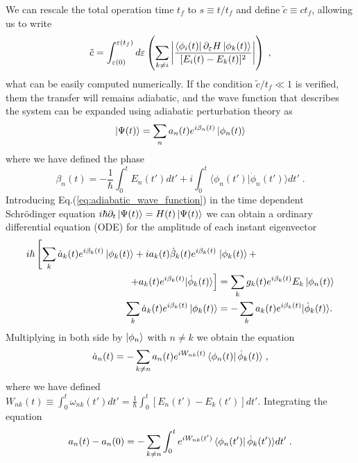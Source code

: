 \documentclass[a4paper,11pt]{article}
\begin{document}
We can rescale the total operation time $t_f$ to $s\equiv t/t_f$ and define $\tilde{c}\equiv ct_f$, allowing us to write
\begin{equation}
	\tilde{c}=\int_{\varepsilon(0)}^{\varepsilon(t_f)}d\varepsilon\left(\sum _{k\neq i}\abs{\frac{\bra{\phi_i(t)}\partial_\varepsilon H\ket{\phi_k(t)}}{[E_i(t)-E_k(t)]^2}}\right)\; , 
	\label{eq:def_c_tilde}
\end{equation}
what can be easily computed numerically. If the condition $\tilde{c}/t_f\ll1$ is verified, them the transfer will remains adiabatic, and the wave function that describes the system can be expanded using adiabatic perturbation theory as
\begin{equation}
	\ket{\Psi(t)}=\sum_n a_n(t)e^{i\beta_n(t)}\ket{\phi_n(t)}
	\label{eq:adiabatic_wave_function}
\end{equation}
where we have defined the phase
\begin{equation}
	\beta_n(t)=-\frac{1}{\hbar}\int_0^tE_n(t')dt'+i\int_0^t\langle\phi_n(t')|\dot{\phi}_n(t')\rangle dt'\; .
\end{equation}
Introducing Eq.(\ref{eq:adiabatic_wave_function}) in the time dependent Schrödinger equation $i\hbar\partial_t\ket{\Psi(t)}=H(t)\ket{\Psi(t)}$ we can obtain a ordinary differential equation (ODE) for the amplitude of each instant eigenvector
\begin{equation}
	\begin{split}
	i\hbar\left[\sum_k \dot{a}_k(t)e^{i\beta_k(t)}\ket{\phi_k(t)}+ia_k(t)\dot{\beta}_k(t)e^{i\beta_k(t)}\right.&\ket{\phi_k(t)}+\\
	\left.+a_k(t)e^{i\beta_k(t)}|\dot{\phi}_k(t)\rangle\right] &= \sum_k g_k(t)e^{i\beta_k(t)}E_k\ket{\phi_n(t)}\\
	\sum_k\dot{a}_k(t)e^{i\beta_k(t)}\ket{\phi_k(t)}&=-\sum_k a_k(t)e^{i\beta_k(t)}|\dot{\phi}_k(t)\rangle.
	\end{split}
\end{equation}
Multiplying in both side by $\ket{\phi_n}$ with $n\neq k$ we obtain the equation
\begin{equation}
	\dot{a}_n(t)=-\sum_{k\neq n}a_n(t)e^{iW_{nk}(t)}\bra{\phi_n(t)}\dot{\phi}_k(t)\rangle\; ,
\end{equation}
where we have defined $W_{nk}(t)\equiv\int_0^t\omega_{nk}(t')dt'=\frac{1}{\hbar}\int_0^t[E_n(t')-E_k(t')]dt'$. Integrating the equation 
\begin{equation}
	a_n(t)-a_n(0)=-\sum_{k\neq n}\int_0^te^{iW_{nk}(t')}\bra{\phi_n(t')}\dot{\phi}_k(t')\rangle dt'\; .
\end{equation}
\end{document}
